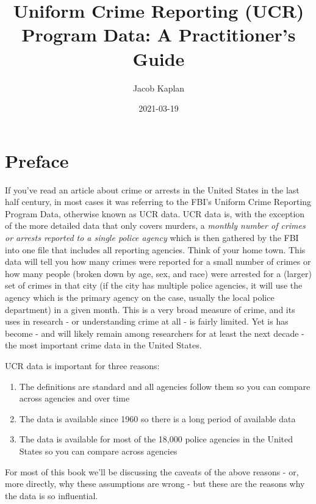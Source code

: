 \documentclass[
  12pt,
  openany]{book}
\title{Uniform Crime Reporting (UCR) Program Data: A Practitioner's Guide}
\author{Jacob Kaplan}
\date{2021-03-19}
\providecommand{\tightlist}{%
  \setlength{\itemsep}{0pt}\setlength{\parskip}{0pt}}
\begin{document}
\maketitle

{
\hypersetup{linkcolor=}
\setcounter{tocdepth}{2}
\tableofcontents
}
\hypertarget{preface}{%
\chapter*{Preface}\label{preface}}


If you've read an article about crime or arrests in the United States in the last half century, in most cases it was referring to the FBI's Uniform Crime Reporting Program Data, otherwise known as UCR data. UCR data is, with the exception of the more detailed data that only covers murders, a \emph{monthly number of crimes or arrests reported to a single police agency} which is then gathered by the FBI into one file that includes all reporting agencies. Think of your home town. This data will tell you how many crimes were reported for a small number of crimes or how many people (broken down by age, sex, and race) were arrested for a (larger) set of crimes in that city (if the city has multiple police agencies, it will use the agency which is the primary agency on the case, usually the local police department) in a given month. This is a very broad measure of crime, and its uses in research - or understanding crime at all - is fairly limited. Yet is has become - and will likely remain among researchers for at least the next decade - the most important crime data in the United States.

UCR data is important for three reasons:

\begin{enumerate}
\def\labelenumi{\arabic{enumi}.}
\tightlist
\item
  The definitions are standard and all agencies follow them so you can compare across agencies and over time
\item
  The data is available since 1960 so there is a long period of available data
\item
  The data is available for most of the 18,000 police agencies in the United States so you can compare across agencies
\end{enumerate}

For most of this book we'll be discussing the caveats of the above reasons - or, more directly, why these assumptions are wrong - but these are the reasons why the data is so influential.
\end{document}
